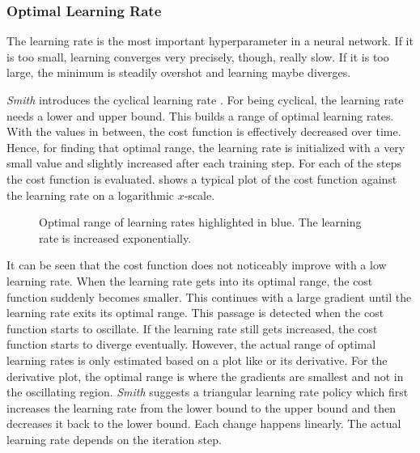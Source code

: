 \subsubsection{Optimal Learning Rate}
\label{sec:improving-performance-learning-rate}
The learning rate is the most important hyperparameter in a neural network.
If it is too small, learning converges very precisely, though, really slow.
If it is too large, the minimum is steadily overshot and learning maybe diverges.

\textit{Smith} introduces the cyclical learning rate \cite{DBLP:journals/corr/Smith15a}.
For being cyclical, the learning rate needs a lower and upper bound.
This builds a range of optimal learning rates.
With the values in between, the cost function is effectively decreased over time.
Hence, for finding that optimal range, the learning rate is initialized with a very small value and slightly increased after each training step.
For each of the steps the cost function is evaluated.
 shows a typical plot of the cost function against the learning rate on a logarithmic $x$-scale.
\begin{figure}
	\setlength{}
	\setlength{}
	\centering
	
	\caption[Optimal range of learning rates]{Optimal range of learning rates highlighted in blue. The learning rate is increased exponentially.}
	\label{fig:optimal-learning-rate-range}
\end{figure}
It can be seen that the cost function does not noticeably improve with a low learning rate.
When the learning rate gets into its optimal range, the cost function suddenly becomes smaller.
This continues with a large gradient until the learning rate exits its optimal range.
This passage is detected when the cost function starts to oscillate.
If the learning rate still gets increased, the cost function starts to diverge eventually.
However, the actual range of optimal learning rates is only estimated based on a plot like  or its derivative.
For the derivative plot, the optimal range is where the gradients are smallest and not in the oscillating region.
\textit{Smith} suggests a triangular learning rate policy which first increases the learning rate from the lower bound to the upper bound and then decreases it back to the lower bound.
Each change happens linearly.
The actual learning rate depends on the iteration step.

